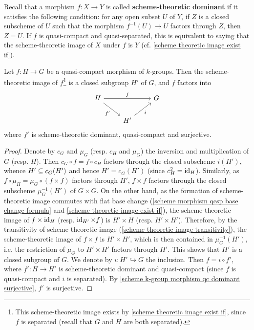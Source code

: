 Recall that a morphism $f:X\to Y$ is called \textbf{scheme-theoretic dominant} if it satisfies the following condition: for any open subset $U$ of $Y$, if $Z$ is a closed subscheme of $U$ such that the morphism $f^{-1}(U)\to U$ factors through $Z$, then $Z=U$. If $f$ is quasi-compact and quasi-separated, this is equivalent to saying that the scheme-theoretic image of $X$ under $f$ is $Y$ (cf. \cref{scheme theoretic image exist if}).

\begin{proposition}\label{scheme k-group morphism qc factorization by image}
Let $f:H\to G$ be a quasi-compact morphism of $k$-groups. Then the scheme-theoretic image of $f$\footnote{This scheme-theoretic image exists by \cref{scheme theoretic image exist if}, since $f$ is separated (recall that $G$ and $H$ are both separated).} is a closed subgroup $H'$ of $G$, and $f$ factors into
\[\begin{tikzcd}
H\ar[rr,"f"]\ar[rd,swap,"f'"]&&G\\
&H'\ar[ru,swap,"i"]
\end{tikzcd}\]
where $f'$ is scheme-theoretic dominant, quasi-compact and surjective.
\end{proposition}
\begin{proof}
Denote by $c_G$ and $\mu_G$ (resp. $c_H$ and $\mu_G$) the inversion and multiplication of $G$ (resp. $H$). Then $c_G\circ f=f\circ c_H$ factors through the closed subscheme $i(H')$, whence $H'\subseteq c_G(H')$ and hence $H'=c_G(H')$ (since $c_H^2=\operatorname{id}_H$). Similarly, as $f\circ\mu_H=\mu_G\circ(f\times f)$ factors through $H'$, $f\times f$ factors through the closed subscheme $\mu_G^{-1}(H')$ of $G\times G$. On the other hand, as the formation of scheme-theoretic image commutes with flat base change (\cref{scheme morphism qcsp base change formula} and \cref{scheme theoretic image exist if}), the scheme-theoretic image of $f\times\operatorname{id}_H$ (resp. $\operatorname{id}_{H'}\times f$) is $H'\times H$ (resp. $H'\times H'$). Therefore, by the transitivity of scheme-theoretic image (\cref{scheme theoretic image transitivity}), the scheme-theoretic image of $f\times f$ is $H'\times H'$, which is then contained in $\mu_G^{-1}(H')$, i.e. the restriction of $\mu_G$ to $H'\times H'$ factors through $H'$. This shows that $H'$ is a closed subgroup of $G$. We denote by $i:H'\hookrightarrow G$ the inclusion. Then $f=i\circ f'$, where $f':H\to H'$ is scheme-theoretic dominant and quasi-compact (since $f$ is quasi-compact and $i$ is separated). By \cref{scheme k-group morphism qc dominant surjective}, $f'$ is surjective.
\end{proof}


